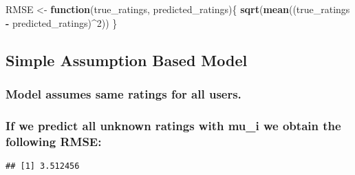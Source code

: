 \documentclass[
]{article}
\newenvironment{Shaded}{\begin{snugshade}}{\end{snugshade}}
\newcommand{\ControlFlowTok}[1]{\textcolor[rgb]{0.13,0.29,0.53}{\textbf{#1}}}
\newcommand{\DecValTok}[1]{\textcolor[rgb]{0.00,0.00,0.81}{#1}}
\newcommand{\KeywordTok}[1]{\textcolor[rgb]{0.13,0.29,0.53}{\textbf{#1}}}
\newcommand{\NormalTok}[1]{#1}
\newcommand{\OperatorTok}[1]{\textcolor[rgb]{0.81,0.36,0.00}{\textbf{#1}}}
\newcommand{\StringTok}[1]{\textcolor[rgb]{0.31,0.60,0.02}{#1}}
\begin{document}
\begin{Shaded}
\begin{Highlighting}[]
\NormalTok{RMSE <-}\StringTok{ }\ControlFlowTok{function}\NormalTok{(true_ratings, predicted_ratings)\{}
  \KeywordTok{sqrt}\NormalTok{(}\KeywordTok{mean}\NormalTok{((true_ratings }\OperatorTok{-}\StringTok{ }\NormalTok{predicted_ratings)}\OperatorTok{^}\DecValTok{2}\NormalTok{))}
\NormalTok{\}}
\end{Highlighting}
\end{Shaded}

\hypertarget{simple-assumption-based-model}{%
\subsection{Simple Assumption Based
Model}\label{simple-assumption-based-model}}

\hypertarget{model-assumes-same-ratings-for-all-users.}{%
\subsubsection{Model assumes same ratings for all
users.}\label{model-assumes-same-ratings-for-all-users.}}

\hypertarget{if-we-predict-all-unknown-ratings-with-mu_i-we-obtain-the-following-rmse}{%
\subsubsection{If we predict all unknown ratings with mu\_i we obtain
the following
RMSE:}\label{if-we-predict-all-unknown-ratings-with-mu_i-we-obtain-the-following-rmse}}

\begin{Shaded}
\end{Shaded}

\begin{verbatim}
## [1] 3.512456
\end{verbatim}

\begin{Shaded}
\end{Shaded}
\end{document}
